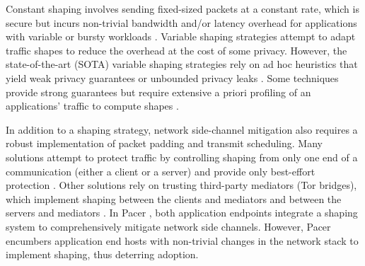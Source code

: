 Constant shaping involves sending fixed-sized packets at a constant rate, which
is secure but incurs non-trivial bandwidth and/or latency overhead for
applications with variable or bursty workloads \cite{saponas2007devices}.
Variable shaping strategies attempt to adapt traffic shapes to reduce the
overhead
at the cost of some privacy. However, the state-of-the-art (SOTA) variable
shaping strategies rely on ad hoc heuristics that yield weak privacy guarantees
\cite{wang2014supersequence, nithyanand2014glove, wang2017walkietalkie} or
unbounded privacy leaks \cite{gong2020zero, cai2014csbuflo,
lu2018dynaflow, juarez2016wtfpad, cai2014tamaraw}.
Some techniques provide strong guarantees but
require extensive a priori profiling of an applications' traffic to compute
shapes
\cite{mehta2022pacer, zhang2019statistical}.

%
%
%
In addition to a shaping strategy, network side-channel mitigation also
requires a robust implementation of packet padding and transmit scheduling.
Many solutions attempt to protect traffic by controlling shaping from only one
end of a communication (\ie either a client or a server) and provide only
best-effort protection
\cite{luo2011httpos, smith2022qcsd, cherubin2017llama}. Other solutions rely on
trusting third-party mediators (\eg Tor bridges), which implement shaping
between the clients and mediators and between the servers and mediators
\cite{mohajeri2012skypemorph, winter2013scramblesuit}.
In Pacer \cite{mehta2022pacer}, both application endpoints integrate a
shaping system to comprehensively mitigate network side channels. However, Pacer
encumbers application end hosts with non-trivial changes in the network
stack to implement shaping, thus deterring adoption.

